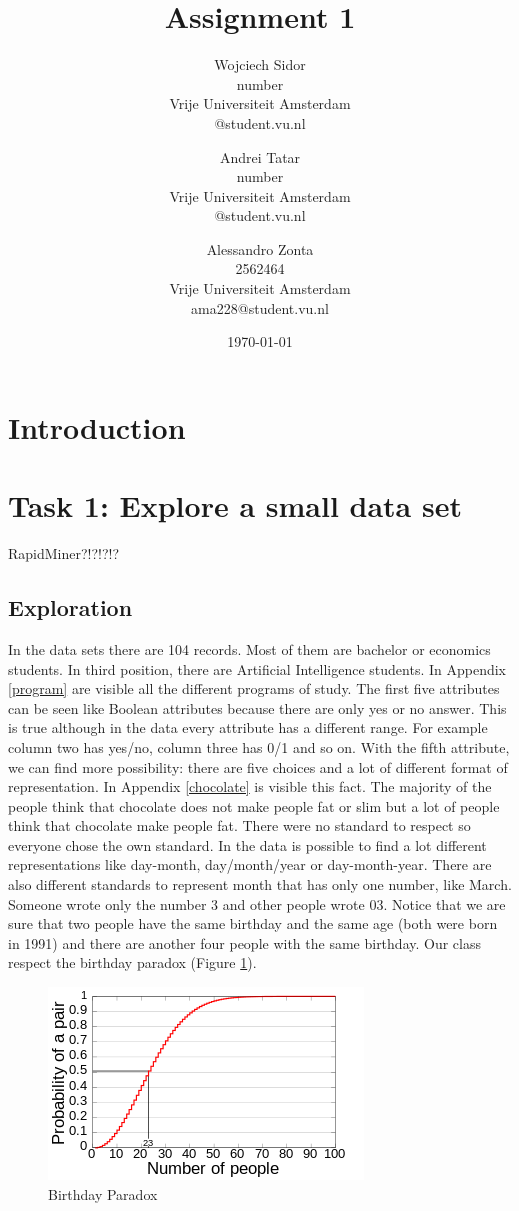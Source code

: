 \documentclass{vldb}
\title{Assignment 1}
\author{
	Wojciech Sidor\\
	number\\
	Vrije Universiteit Amsterdam\\
	@student.vu.nl
	\and
	Andrei Tatar\\
	number\\
	Vrije Universiteit Amsterdam\\
	@student.vu.nl
	\and
	Alessandro Zonta\\
	2562464\\
	Vrije Universiteit Amsterdam\\
	ama228@student.vu.nl
}
\date{\today}
\begin{document}
\maketitle

\section{Introduction}

	
\section{Task 1: Explore a small data set}
	RapidMiner?!?!?!?
	
	\subsection{Exploration}
	In the data sets there are 104 records.
	Most of them are bachelor or economics students.
	In third position, there are Artificial Intelligence students.
	In Appendix \ref{program} are visible all the different programs of study.
	The first five attributes can be seen like Boolean attributes because there are only yes or no answer.
	This is true although in the data every attribute has a different range.
	For example column two has yes/no, column three has 0/1 and so on.
	With the fifth attribute, we can find more possibility: there are five choices and a lot of different format of representation.
	In Appendix \ref{chocolate} is visible this fact.
	The majority of the people think that chocolate does not make people fat or slim but a lot of people think that chocolate make people fat.
	There were no standard to respect so everyone chose the own standard.
	In the data is possible to find a lot different representations like day-month, day/month/year or day-month-year.
	There are also different standards to represent month that has only one number, like March.
	Someone wrote only the number 3 and other people wrote 03.
	Notice that we are sure that two people have the same birthday and the same age (both were born in 1991) and there are another four people with the same birthday.
	Our class respect the birthday paradox (Figure \ref{fig1}).
	\begin{figure}[h]
		\centering
		\includegraphics[scale=0.5]{0.png}
		\caption{Birthday Paradox}
		\label{fig1}
	\end{figure}
\end{document}
